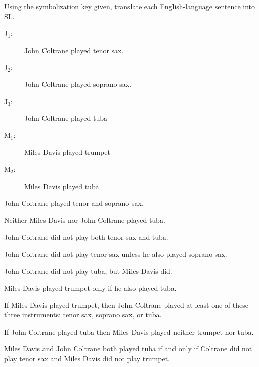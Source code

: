 
\noindent\problempart Using the symbolization key given, translate each English-language sentence into SL.
\label{pr.jazzinstruments}
\begin{description}
\item[J$_1$:] John Coltrane played tenor sax.
\item[J$_2$:] John Coltrane played soprano sax.
\item[J$_3$:] John Coltrane played tuba
\item[M$_1$:] Miles Davis played trumpet
\item[M$_2$:]Miles Davis played tuba
\end{description}

\begin{exercises}
\item John Coltrane played tenor and soprano sax. %
\item Neither Miles Davis nor John Coltrane played tuba. %
\item John Coltrane did not play both tenor sax and tuba.  %
\item John Coltrane did not play tenor sax unless he also played soprano sax. %
\item John Coltrane did not play tuba, but Miles Davis did. %
\item Miles Davis played trumpet only if he also played tuba. %
\item If Miles Davis played trumpet, then John Coltrane played at least one of these three instruments: tenor sax, soprano sax, or tuba. %
\item If John Coltrane played tuba then Miles Davis played neither trumpet nor tuba. %
\item Miles Davis and John Coltrane both played tuba if and only if Coltrane did not play tenor sax and Miles Davis did not play trumpet. %
\end{exercises}


